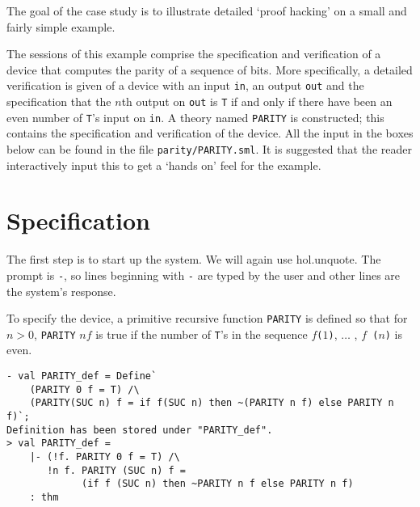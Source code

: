 The goal of the case study is to illustrate detailed `proof hacking'
on a small and fairly simple example.

The sessions of this example comprise the specification and
verification of a device that computes the parity of a sequence of
bits.  More specifically, a detailed verification is given of a device
with an input {\small\verb|in|}, an output {\small\verb|out|} and the
specification that the $n$th output on {\small\verb|out|} is
{\small\verb|T|} if and only if there have been an even number of
{\small\verb|T|}'s input on {\small\verb|in|}. A theory named
{\small\verb|PARITY|} is constructed; this contains the specification
and verification of the device. All the \ML{} input in the boxes below
can be found in the file {\small\verb|parity/PARITY.sml|}. It is
suggested that the reader interactively input this to get a `hands on'
feel for the example.


\section{Specification}
\label{example}
The first step is to start up the \HOL{} system.  We will again use
\textsf{hol.unquote}.  The \ML{} prompt is {\small\verb|-|}, so lines
beginning with {\small\verb|-|} are typed by the user and other lines
are the system's response.

To specify the device, a primitive recursive function
{\small\verb|PARITY|} is defined so that for $n>0$, {\small\tt PARITY}
$n f$ is true if the number of {\small\verb|T|}'s in the sequence
$f${\small\tt (}$1${\small\tt)}, $\ldots$ , $f${\small\tt
  (}$n${\small\tt)} is even.

\setcounter{sessioncount}{0}
\begin{session}
\begin{verbatim}
- val PARITY_def = Define`
    (PARITY 0 f = T) /\
    (PARITY(SUC n) f = if f(SUC n) then ~(PARITY n f) else PARITY n f)`;
Definition has been stored under "PARITY_def".
> val PARITY_def =
    |- (!f. PARITY 0 f = T) /\
       !n f. PARITY (SUC n) f =
             (if f (SUC n) then ~PARITY n f else PARITY n f)
    : thm
\end{verbatim}
\end{session}

\noindent

